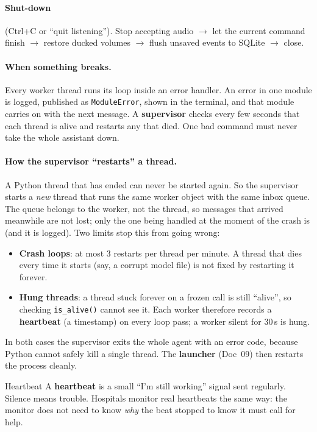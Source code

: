 \documentclass[11pt,a4paper]{article}
\begin{document}
\paragraph{Shut-down} (Ctrl+C or ``quit listening''). Stop accepting audio $\to$ let the
current command finish $\to$ restore ducked volumes $\to$ flush unsaved events to SQLite
$\to$ close.

\paragraph{When something breaks.} Every worker thread runs its loop inside an error handler.
An error in one module is logged, published as \texttt{ModuleError}, shown in the terminal, and
that module carries on with the next message. A \textbf{supervisor} checks every few seconds that
each thread is alive and restarts any that died. One bad command must never take the whole
assistant down.

\paragraph{How the supervisor ``restarts'' a thread.} A Python thread that has ended can never be
started again. So the supervisor starts a \emph{new} thread that runs the same worker object
with the same inbox queue. The queue belongs to the worker, not the thread, so messages that
arrived meanwhile are not lost; only the one being handled at the moment of the crash is (and it is
logged). Two limits stop this from going wrong:
\begin{itemize}[nosep]
  \item \textbf{Crash loops}: at most 3 restarts per thread per minute. A thread that dies every
        time it starts (say, a corrupt model file) is not fixed by restarting it forever.
  \item \textbf{Hung threads}: a thread stuck forever on a frozen call is still ``alive'', so
        checking \texttt{is\_alive()} cannot see it. Each worker therefore records a
        \textbf{heartbeat} (a timestamp) on every loop pass; a worker silent for 30\,s is hung.
\end{itemize}
In both cases the supervisor exits the whole agent with an error code, because Python cannot
safely kill a single thread. The \textbf{launcher} (Doc~09) then restarts the process cleanly.

\begin{concept}{Heartbeat}
A \textbf{heartbeat} is a small ``I'm still working'' signal sent regularly. Silence means
trouble. Hospitals monitor real heartbeats the same way: the monitor does not need to know
\emph{why} the beat stopped to know it must call for help.
\end{concept}
\end{document}
